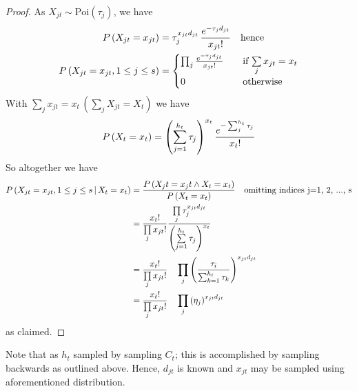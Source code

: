 			\begin{proof}
				As $X_{jt} \sim \text{Poi}(\tau_j)$, we have
				\begin{align*}
					P \left(X_{jt} = x_{jt}\right)& = 
					\tau_j^{x_{jt} d_{jt}} \,
					\frac{e^{- \tau_j d_{jt}}}{x_{jt}!} \quad \text{hence} \\
					P \left(X_{jt} = x_{jt}, 1 \leq j \leq s\right)
					&= \begin{cases}
						 \prod_j 	\frac{e^{- \tau_j d_{jt}}}{x_{jt}!}
						 	&\quad \text{if} \, \sum\limits_{j} x_{jt} = x_t \\
						 0  & \quad \text{otherwise}
					\end{cases}
				\end{align*}
				With $\sum_{j} x_{jt} = x_t \,  \left(\sum_{j} X_{jt} = X_t\right)$ we have
				\[
					\uP{X_t = x_t} = \left(
						\sum_{j=1}^{h_t} \tau_j
					\right)^{x_t} 
%					
					\frac{e^{- \sum_{j}^{h_t} \tau_j}}{
					x_t!}	
				\]
				So altogether we have
				\begin{align*}
					P\left(X_{jt} = x_{jt}, 1 \leq j \leq s \, | \, X_t = x_t\right) &= 
					\frac{P \left(X_jt = x_jt \land X_t = x_t\right)}{P \left(X_t = x_t\right)}
					\quad \text{omitting indices j=1, 2, ..., s} \\
					&= \frac{x_t!}{\prod\limits_j x_{jt}!}
					\frac{
						\prod\limits_j \tau_j^{x_{jt} d_{jt}}}
					{
							\left(
							\sum\limits_{j=1}^{h_t} \tau_j
							\right)^{ x_t}
					} \\
				&= \frac{x_t!}{\prod\limits_j x_{jt}!}\quad
				\prod\limits_{j} \left(
					\frac{\tau_i}{\sum_{k=1}^{h_t} \tau_k}
				\right)^{x_{jt} d_{jt}} \\
				&= \frac{x_t!}{\prod\limits_j x_{jt}!}\quad
				\prod\limits_{j} \left(
					\eta_j
				\right)^{x_{jt} d_{jt}}
				\end{align*}
				as claimed. 
			\end{proof}
		
		Note that as $h_t$ sampled by sampling $C_t$; this is accomplished by sampling backwards as outlined above. Hence, $d_{jt}$ is known and $x_{jt}$ may be sampled using aforementioned distribution. 
		
		 
 	
 		
 	
 		